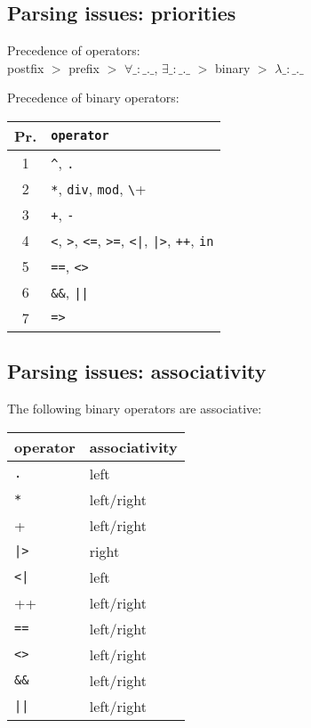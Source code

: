 \documentclass{article}
\newcommand{\frm}[1]{\mbox{\ensuremath{#1}}}
\begin{document}
\begin{slidetop}
\section*{Parsing issues: priorities}

Precedence of operators:\\
postfix \frm{>} prefix \frm{>} \frm{\forall \_{:}\_.\_}, \frm{\exists \_{:}\_.\_}  \frm{>} binary \frm{>} \frm{\lambda \_{:}\_.\_}

\bigskip
Precedence of binary operators: 
\begin{center}
\begin{tabular}{|c|l|}
\hline
Pr. & \verb+operator+\\\hline
1 & \verb+^+, \verb+.+\\
2 & \verb+*+, \verb+div+, \verb+mod+, \verb+\+\\
3 & \verb-+-, \verb+-+\\
4 & \verb+<+, \verb+>+, \verb+<=+, \verb+>=+, \verb+<|+, \verb+|>+, \verb-++-, \verb+in+\\
5 & \verb+==+, \verb+<>+\\
6 & \verb+&&+, \verb+||+\\
7 & \verb+=>+\\\hline
\end{tabular}
\end{center}
\end{slidetop}

\begin{slidetop}
\section*{Parsing issues: associativity}

The following binary operators are associative:
\begin{center}
\begin{tabular}{|ll|}
\hline
operator        & associativity\\\hline
\verb+.+        & left\\
\verb+*+        & left/right\\
\verb+++        & left/right\\
\verb+|>+       & right\\
\verb+<|+       & left\\
\verb++++       & left/right\\
\verb+==+       & left/right\\
\verb+<>+       & left/right\\
\verb+&&+       & left/right\\
\verb+||+       & left/right\\\hline
\end{tabular}
\end{center}
\end{slidetop}
\end{document}

